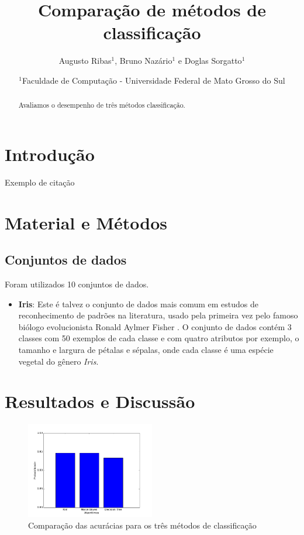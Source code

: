 \documentclass[12pt, a4paper, brazil]{article}
\title{Comparação de métodos de classificação}
\author{Augusto Ribas$^1$, Bruno Nazário$^1$ e Doglas Sorgatto$^1$}
\date{$^1$Faculdade de Computação - Universidade Federal de Mato Grosso do Sul}
\begin{document}
\maketitle

\begin{abstract}
Avaliamos o desempenho de três métodos classificação.
\end{abstract}
%
\section{Introdução}

Exemplo de citação  \citep{Mitchell1997}

\section{Material e Métodos}

\subsection{Conjuntos de dados}

Foram utilizados 10 conjuntos de dados.

\begin{itemize}

\item \textbf{Iris}: Este é talvez o conjunto de dados mais comum em estudos de reconhecimento de padrões na literatura, usado pela primeira vez pelo famoso biólogo evolucionista Ronald Aylmer Fisher \citep{Fisher1936}. O conjunto de dados contém 3 classes com 50 exemplos de cada classe e com quatro atributos por exemplo, o tamanho e largura de pétalas e sépalas, onde cada classe é uma espécie vegetal do gênero \emph{Iris}.

\end{itemize}

\section{Resultados e Discussão}

\begin{figure}[!htb]
  \caption{Comparação das acurácias para os três métodos de classificação}
  \centering
    \includegraphics[width=0.5\textwidth]{iris/acuracias.png}
\end{figure}
\end{document}
